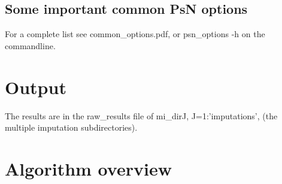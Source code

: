 \subsection{Some important common PsN options}
For a complete list see common\_options.pdf, 
or psn\_options -h on the commandline.



\section{Output}
The results are in the raw\_results file of mi\_dirJ, J=1:'imputations', (the multiple imputation subdirectories).

\section{Algorithm overview}

